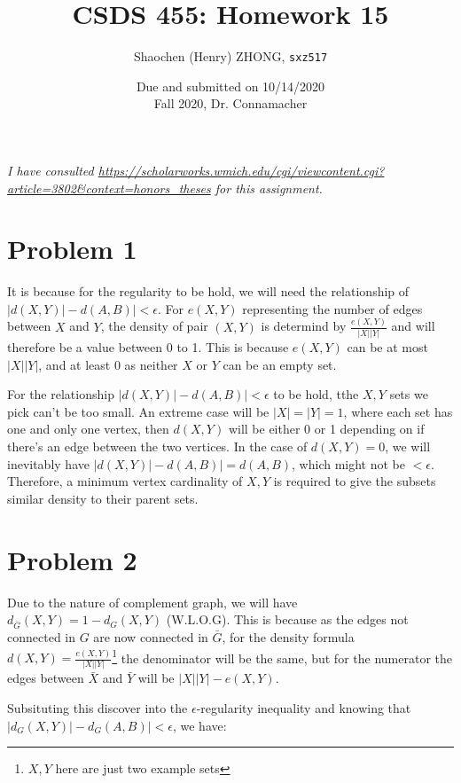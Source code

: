 \documentclass[11pt]{article}
\newcommand{\ilc}{\texttt}
\begin{document}
\title{\textbf{CSDS 455: Homework 15}}

\author{Shaochen (Henry) ZHONG, \ilc{sxz517}}
\date{Due and submitted on 10/14/2020 \\ Fall 2020, Dr. Connamacher}
\maketitle

\textit{I have consulted \url{https://scholarworks.wmich.edu/cgi/viewcontent.cgi?article=3802&context=honors_theses} for this assignment.}

\section*{Problem 1}

It is because for the regularity to be hold, we will need the relationship of $|d(X, Y)| - d(A, B)| < \epsilon$. For $e(X, Y)$ representing the number of edges between $X$ and $Y$, the density of pair $(X, Y)$ is determind by $\frac{e(X, Y)}{|X||Y|}$ and will therefore be a value between 0 to 1. This is because $e(X, Y)$ can be at most $|X||Y|$, and at least $0$ as neither $X$ or $Y$ can be an empty set.

For the relationship $|d(X, Y)| - d(A, B)| < \epsilon$ to be hold, tthe $X, Y$ sets we pick can't be too small. An extreme case will be $|X| = |Y| = 1$, where each set has one and only one vertex, then $d(X, Y)$ will be either 0 or 1 depending on if there's an edge between the two vertices. In the case of $d(X, Y) = 0$, we will inevitably have $|d(X, Y)| - d(A, B)| = d(A, B)$, which might not be $< \epsilon$. Therefore, a minimum vertex cardinality of $X, Y$ is required to give the subsets similar density to their parent sets.


\section*{Problem 2}

Due to the nature of complement graph, we will have $d_{\bar{G}}(X, Y) = 1 - d_G(X, Y)$ (W.L.O.G). This is because as the edges not connected in $G$ are now connected in $\bar{G}$, for the density formula $d(X, Y) = \frac{e(X, Y)}{|X||Y|}$\footnote{$X, Y$ here are just two example sets} the denominator will be the same, but for the numerator the edges between $\bar{X}$ and $\bar{Y}$ will be $|X||Y| - e(X, Y)$.

Subsituting this discover into the $\epsilon$-regularity inequality and knowing that $|d_G(X, Y)| - d_G(A, B)| < \epsilon$, we have:
\end{document}
